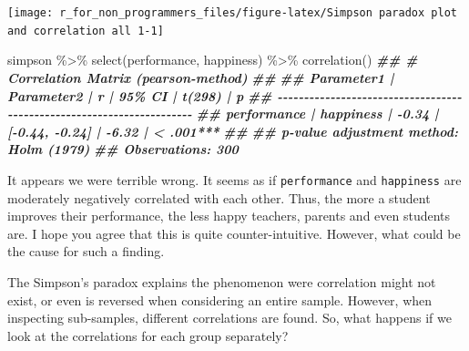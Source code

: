 \documentclass[
]{book}
\newenvironment{Shaded}{\begin{snugshade}}{\end{snugshade}}
\newcommand{\DocumentationTok}[1]{\textcolor[rgb]{0.56,0.35,0.01}{\textbf{\textit{#1}}}}
\newcommand{\FunctionTok}[1]{\textcolor[rgb]{0.00,0.00,0.00}{#1}}
\newcommand{\NormalTok}[1]{#1}
\newcommand{\SpecialCharTok}[1]{\textcolor[rgb]{0.00,0.00,0.00}{#1}}
\begin{document}
\begin{center}\texttt{[image: r\_for\_non\_programmers\_files/figure-latex/Simpson paradox plot and correlation all 1-1]} \end{center}

\begin{Shaded}
\begin{Highlighting}[]

\NormalTok{simpson }\SpecialCharTok{\%\textgreater{}\%} 
  \FunctionTok{select}\NormalTok{(performance, happiness) }\SpecialCharTok{\%\textgreater{}\%} 
  \FunctionTok{correlation}\NormalTok{()}
\DocumentationTok{\#\# \# Correlation Matrix (pearson{-}method)}
\DocumentationTok{\#\# }
\DocumentationTok{\#\# Parameter1  | Parameter2 |     r |         95\% CI | t(298) |         p}
\DocumentationTok{\#\# {-}{-}{-}{-}{-}{-}{-}{-}{-}{-}{-}{-}{-}{-}{-}{-}{-}{-}{-}{-}{-}{-}{-}{-}{-}{-}{-}{-}{-}{-}{-}{-}{-}{-}{-}{-}{-}{-}{-}{-}{-}{-}{-}{-}{-}{-}{-}{-}{-}{-}{-}{-}{-}{-}{-}{-}{-}{-}{-}{-}{-}{-}{-}{-}{-}{-}{-}{-}{-}{-}}
\DocumentationTok{\#\# performance |  happiness | {-}0.34 | [{-}0.44, {-}0.24] |  {-}6.32 | \textless{} .001***}
\DocumentationTok{\#\# }
\DocumentationTok{\#\# p{-}value adjustment method: Holm (1979)}
\DocumentationTok{\#\# Observations: 300}
\end{Highlighting}
\end{Shaded}

It appears we were terrible wrong. It seems as if \texttt{performance} and \texttt{happiness} are moderately negatively correlated with each other. Thus, the more a student improves their performance, the less happy teachers, parents and even students are. I hope you agree that this is quite counter-intuitive. However, what could be the cause for such a finding.

The Simpson's paradox explains the phenomenon were correlation might not exist, or even is reversed when considering an entire sample. However, when inspecting sub-samples, different correlations are found. So, what happens if we look at the correlations for each group separately?
\end{document}
